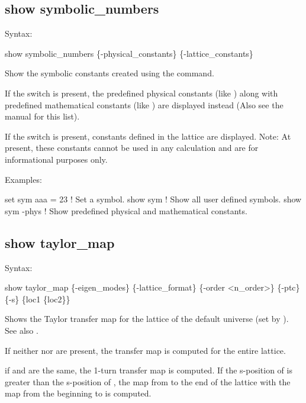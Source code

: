 {{{{{{{{{%

\subsection{show symbolic_numbers}
\label{s:show.symbolic}

Syntax:
\begin{example}
  show symbolic_numbers \{-physical_constants\} \{-lattice_constants\}
\end{example}

Show the symbolic constants created using the  command. 

If the  switch is present, the predefined physical constants (like
) along with predefined mathematical constants (like ) are displayed instead
(Also see the \bmad manual for this list).

If the  switch is present, constants defined in the lattice are displayed.
Note: At present, these constants cannot be used in any calculation and are for informational
purposes only.

Examples:
\begin{example}
  set sym aaa = 23  ! Set a symbol.
  show sym          ! Show all user defined symbols.
  show sym -phys    ! Show predefined physical and mathematical constants.
\end{example}


\subsection{show taylor_map}
\label{s:show.taylor}

Syntax:
\begin{example}
  show taylor_map \{-eigen_modes\} \{-lattice_format\} \{-order <n_order>\} 
                  \{-ptc\} \{-s\} \{loc1 \{loc2\}\}
\end{example}

Shows the Taylor transfer map for the  lattice of the default universe (set by
).  See also .

If neither  nor  are present, the transfer map is computed for the
entire lattice.

if  and  are the same, the 1-turn transfer map is computed. If the
s-position of  is greater than the s-position of , the map from
 to the end of the lattice with the map from the beginning to  is
computed.

}}}}}}}}}
